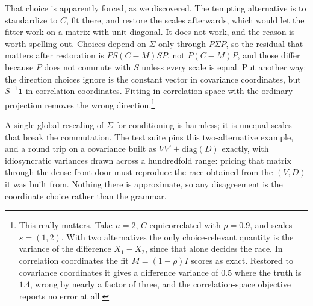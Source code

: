 \documentclass[11pt]{article}
\begin{document}
That choice is apparently forced, as we discovered. The tempting
alternative is to standardize to $C$,
fit there, and restore the scales afterwards, which would let the fitter
work on a matrix with unit diagonal. It does not work, and the reason is
worth spelling out. Choices depend on $\Sigma$ only through $P\Sigma P$, so
the residual that matters after restoration is $PS(C-M)SP$, not
$P(C-M)P$, and those differ because $P$ does not commute with $S$ unless
every scale is equal. Put another way: the direction choices ignore is
the constant vector in covariance coordinates, but $S^{-1}\mathbf{1}$ in
correlation coordinates. Fitting in correlation space with the ordinary
projection removes the wrong direction.\footnote{This really matters. Take $n=2$, $C$ equicorrelated with $\rho=0.9$, and
scales $s=(1,2)$. With two alternatives the only choice-relevant
quantity is the variance of the difference $X_1-X_2$, since that alone
decides the race. In correlation coordinates the fit $M=(1-\rho)I$ scores as exact.
Restored to covariance coordinates it gives a difference variance of
$0.5$ where the truth is $1.4$, wrong by nearly a factor of three, and
the correlation-space objective reports no error at all.}

A single global rescaling of $\Sigma$ for conditioning is harmless; it is
unequal scales that break the commutation. The test suite pins this
two-alternative example, and a round trip on a covariance built as
$VV'+\mathrm{diag}(D)$ exactly, with idiosyncratic variances drawn across
a hundredfold range: pricing that matrix through the dense front door
must reproduce the race obtained from the $(V,D)$ it was built from.
Nothing there is approximate, so any disagreement is the coordinate
choice rather than the grammar.
\end{document}
